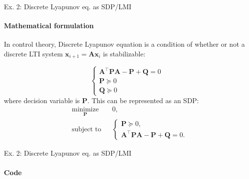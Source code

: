 \documentclass{beamer}
\begin{document}
\begin{frame}{Ex. 2: Discrete Lyapunov eq. as SDP/LMI}
\framesubtitle{Mathematical formulation}
\begin{flushleft}

In control theory, Discrete Lyapunov equation is a condition of whether or not a discrete LTI system $\mathbf{x}_{i+1} = \mathbf{A}\mathbf{x}_i$ is stabilizable:

\begin{equation}
    \begin{cases}
        \mathbf{A}^\top \mathbf{P}\mathbf{A} - \mathbf{P} + \mathbf{Q} = 0 \\
        \mathbf{P} \succeq 0 \\
        \mathbf{Q} \succeq 0 
    \end{cases}
\end{equation}
%
where decision variable is $\mathbf{P}$. This can be represented as an SDP:
%
\begin{equation}
\begin{aligned}
& \underset{\mathbf{P}}{\text{minimize}}
& & 0, \\
& \text{subject to}
& & \begin{cases}
    \mathbf{P} \succeq 0, \\
    \mathbf{A}^\top \mathbf{P}\mathbf{A} - \mathbf{P} + \mathbf{Q} = 0.
    \end{cases}
\end{aligned}
\end{equation}


\end{flushleft}
\end{frame}



\begin{frame}{Ex. 2: Discrete Lyapunov eq. as SDP/LMI}
\framesubtitle{Code}
\begin{flushleft}



\end{flushleft}
\end{frame}
\end{document}

